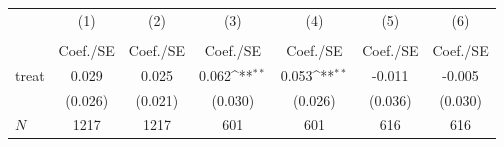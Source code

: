 {
\def\sym#1{\ifmmode^{#1}\else\(^{#1}\)\fi}
\begin{tabular}{l*{6}{c}}
\hline\hline
            &\multicolumn{1}{c}{(1)}&\multicolumn{1}{c}{(2)}&\multicolumn{1}{c}{(3)}&\multicolumn{1}{c}{(4)}&\multicolumn{1}{c}{(5)}&\multicolumn{1}{c}{(6)}\\
            &\multicolumn{1}{c}{} &\multicolumn{1}{c}{} &\multicolumn{1}{c}{} &\multicolumn{1}{c}{} &\multicolumn{1}{c}{} &\multicolumn{1}{c}{} \\
            &    Coef./SE         &    Coef./SE         &    Coef./SE         &    Coef./SE         &    Coef./SE         &    Coef./SE         \\
\hline
treat       &       0.029         &       0.025         &       0.062\sym{**} &       0.053\sym{**} &      -0.011         &      -0.005         \\
            &     (0.026)         &     (0.021)         &     (0.030)         &     (0.026)         &     (0.036)         &     (0.030)         \\
\hline
\(N\)       &        1217         &        1217         &         601         &         601         &         616         &         616         \\
\hline\hline
\end{tabular}
}
